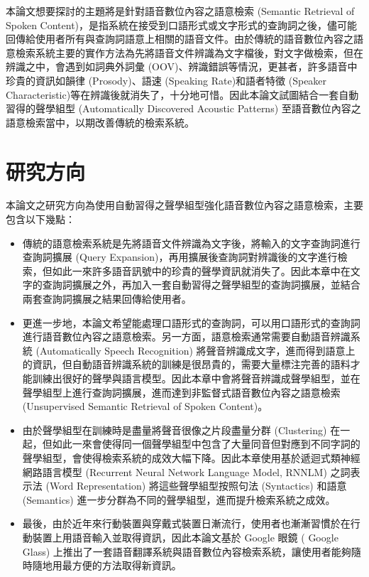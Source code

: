 本論文想要探討的主題將是針對語音數位內容之語意檢索 (Semantic Retrieval of Spoken Content)，是指系統在接受到口語形式或文字形式的查詢詞之後，儘可能回傳給使用者所有與查詢詞語意上相關的語音文件。由於傳統的語音數位內容之語意檢索系統主要的實作方法為先將語音文件辨識為文字檔後，對文字做檢索，但在辨識之中，會遇到如詞典外詞彙
(OOV)、辨識錯誤等情況，更甚者，許多語音中珍貴的資訊如韻律 (Prosody)、語速 (Speaking Rate)和語者特徵 (Speaker Characteristic)等在辨識後就消失了，十分地可惜。因此本論文試圖結合一套自動習得的聲學組型 (Automatically Discovered Acoustic Patterns) 至語音數位內容之語意檢索當中，以期改善傳統的檢索系統。

\section{研究方向}
本論文之研究方向為使用自動習得之聲學組型強化語音數位內容之語意檢索，主要包含以下幾點：

\begin{itemize}
\itemsep -2pt %
  \item  傳統的語意檢索系統是先將語音文件辨識為文字後，將輸入的文字查詢詞進行查詢詞擴展 (Query Expansion)，再用擴展後查詢詞對辨識後的文字進行檢索，但如此一來許多語音訊號中的珍貴的聲學資訊就消失了。因此本章中在文字的查詢詞擴展之外，再加入一套自動習得之聲學組型的查詢詞擴展，並結合兩套查詢詞擴展之結果回傳給使用者。

  \item  更進一步地，本論文希望能處理口語形式的查詢詞，可以用口語形式的查詢詞進行語音數位內容之語意檢索。另一方面，語意檢索通常需要自動語音辨識系統 (Automatically Speech Recognition) 將聲音辨識成文字，進而得到語意上的資訊，但自動語音辨識系統的訓練是很昂貴的，需要大量標注完善的語料才能訓練出很好的聲學與語言模型。因此本章中會將聲音辨識成聲學組型，並在聲學組型上進行查詢詞擴展，進而達到非監督式語音數位內容之語意檢索 (Unsupervised Semantic Retrieval of Spoken Content)。
  
  \item  由於聲學組型在訓練時是盡量將聲音很像之片段盡量分群 (Clustering) 在一起，但如此一來會使得同一個聲學組型中包含了大量同音但對應到不同字詞的聲學組型，會使得檢索系統的成效大幅下降。因此本章使用基於遞迴式類神經網路語言模型 (Recurrent Neural Network Language Model, RNNLM) 之詞表示法 (Word Representation) 將這些聲學組型按照句法 (Syntactics) 和語意 (Semantics) 進一步分群為不同的聲學組型，進而提升檢索系統之成效。
   
  \item  最後，由於近年來行動裝置與穿戴式裝置日漸流行，使用者也漸漸習慣於在行動裝置上用語音輸入並取得資訊，因此本論文基於 Google 眼鏡 ( Google Glass) 上推出了一套語音翻譯系統與語音數位內容檢索系統，讓使用者能夠隨時隨地用最方便的方法取得新資訊。

\end{itemize}

